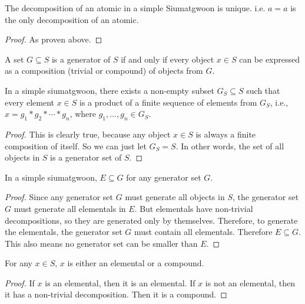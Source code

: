 \begin{lemma}[Atomics]\label{def:atomics}
    The decomposition of an atomic in a simple Siumatgwoon is unique. i.e. $a=a$ is the only decomposition of an atomic.
\end{lemma}
\begin{proof}
    As proven above.
\end{proof}



\begin{definition}[Generators]\label{def:generators}
    A set $G \subseteq S$ is a generator of $S$ if and only if every object $x \in S$ can be expressed as a composition (trivial or compound) of objects from $G$.
\end{definition}

\begin{theorem}\label{thm:generator-sets-exist-in-simple-siumatgwoons}
    In a simple siumatgwoon, there exists a non-empty subset $G_{S} \subseteq S$ such that every element $x \in S$ is a product of a finite sequence of elements from $G_S$, i.e., $x = g_1 * g_2 * \cdots * g_n$, where $g_1, \dots, g_n \in G_S$.
\end{theorem}

\begin{proof}
    This is clearly true, because any object $x\in S$ is always a finite composition of itself. So we can just let $G_S = S$. In other words, the set of all objects in $S$ is a generator set of $S$.
\end{proof}

\begin{lemma}\label{lem:elementals-are-in-every-generator-set}
    In a simple siumatgwoon, $E\subseteq G$ for any generator set $G$.
\end{lemma}
\begin{proof}
    Since any generator set $G$ must generate all objects in $S$, the generator set $G$ must generate all elementals in $E$. But elementals have non-trivial decompositions, so they are generated only by themselves. Therefore, to generate the elementals, the generator set $G$ must contain all elementals. Therefore $E\subseteq G$. This also means no generator set can be smaller than $E$.
\end{proof}

\begin{lemma}\label{lem:elementals-are-not-compounds}
    For any $x\in S$, $x$ is either an elemental or a compound.
\end{lemma}
\begin{proof}
    If $x$ is an elemental, then it is an elemental. If $x$ is not an elemental, then it has a non-trivial decomposition. Then it is a compound.
\end{proof}

